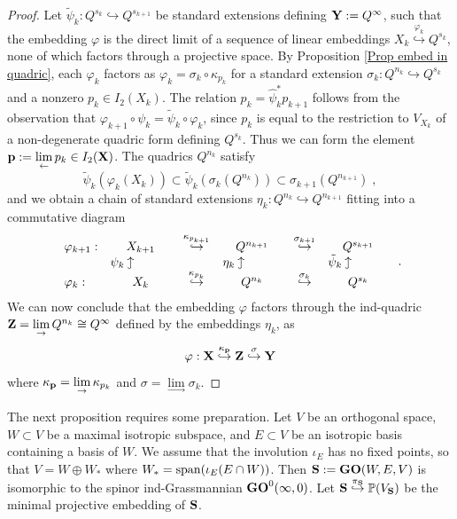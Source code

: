 \documentclass[12pt]{amsart}
\def\PP {{\mathbb P}}     %
\def\hw  {\hookrightarrow}
\newcommand{\huw}{\mathrel{\rotatebox[origin=c]{90}{$\hookrightarrow$}}}
\begin{document}
\begin{proof}
Let $\tilde\psi_k: Q^{s_k}\hw Q^{s_{k+1}}$ be standard extensions defining ${\bf Y}:=Q^{\infty}$, such that the embedding $\varphi$ is the direct limit of a sequence of linear embeddings $X_k\stackrel{\varphi_k}{\hw}Q^{s_k}$, none of which factors through a projective space. By Proposition \ref{Prop embed in quadric}, each $\varphi_k$ factors as $\varphi_k=\sigma_k\circ\kappa_{p_k}$ for a standard extension $\sigma_k:Q^{n_k}\hw Q^{s_k}$ and a nonzero $p_k\in I_2(X_k)$. The relation $p_k=\hat \psi_k^* p_{k+1}$ follows from the observation that $\varphi_{k+1}\circ \psi_k=\tilde\psi_k\circ\varphi_k$, since $p_k$ is equal to the restriction to $V_{X_k}$ of a non-degenerate quadric form defining $Q^{s_k}$. Thus we can form the element ${\bf p}:=\lim\limits_{\leftarrow}p_k\in I_2({\bf X})$. The quadrics $Q^{n_k}$ satisfy 
$$
\tilde\psi_k(\varphi_k(X_k))\subset \tilde\psi_k(\sigma_k(Q^{n_k}))\subset \sigma_{k+1}(Q^{n_{k+1}}) \;,
$$
and we obtain a chain of standard extensions $\eta_k:Q^{n_k}\hw Q^{n_{k+1}}$ fitting into a commutative diagram
\begin{gather*}%
\begin{array}{lccccc}
\varphi_{k+1}: & X_{k+1} & \stackrel{\kappa_{p_{k+1}}}{\hw} & Q^{n_{k+1}} & \stackrel{\sigma_{k+1}}{\hw} & Q^{s_{k+1}} \\
 & \psi_k \huw \qquad\quad & & \eta_k \huw \qquad\quad & & \tilde\psi_k \huw \qquad\quad \\
\varphi_k: & X_{k} & \stackrel{\kappa_{p_k}}{\hw} & Q^{n_k} & \stackrel{\sigma_k}{\hw} & Q^{s_{k}}
\end{array}\;.
\end{gather*}
We can now conclude that the embedding $\varphi$ factors through the ind-quadric ${\bf Z}=\lim\limits_{\to} Q^{n_k}\cong Q^\infty$ defined by the embeddings $\eta_k$, as
$$
\varphi: {\bf X} \stackrel{\kappa_{\bf p}}{\hw} {\bf Z}\stackrel{\sigma}{\hw} {\bf Y}
$$
where $\kappa_{\bf p}=\lim\limits_\to \kappa_{p_k}$ and $\sigma=\lim\limits_\to \sigma_k$.
\end{proof}


The next proposition requires some preparation. Let $V$ be an orthogonal space, $W\subset V$ be a maximal isotropic subspace, and $E\subset V$ be an isotropic basis containing a basis of $W$. We assume that the involution $\iota_E$ has no fixed points, so that $V=W\oplus W_*$ where $W_*={\rm span}(\iota_E(E\cap W))$. Then ${\bf S}:={\bf GO}(W,E,V)$ is isomorphic to the spinor ind-Grassmannian ${\bf GO}^0(\infty,0)$. Let ${\bf S}\stackrel{\pi_{\bf S}}{\hw} \PP(V_{\bf S})$ be the minimal projective embedding of ${\bf S}$. 
\end{document}
